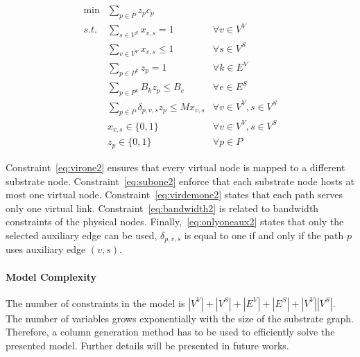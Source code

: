\begin{align}
    \min & \sum\limits_{p \in P}  z_{p} c_{p} \nonumber \\
    s.t. & \sum\limits_{s \in V^{S}} x_{v,s} = 1                                  & \forall v \in V^{V} \label{eq:virone2} \\
         & \sum\limits_{v \in V^{V}} x_{v,s} \leq 1                               & \forall s \in V^{S} \label{eq:subone2}\\
         & \sum\limits_{p \in P^{k}} z_{p} = 1                                    & \forall k \in E^{V} \label{eq:virdemone2}\\
         & \sum\limits_{p \in P^{k}} B_{k} z_{p} \leq B_{e}                                & \forall e \in E^{S} \label{eq:bandwidth2} \\
         & \sum\limits_{p \in P} \delta_{p,v,s} z_{p} \leq M x_{v,s}                 & \forall v \in V^{V}, s \in V^{S} \label{eq:onlyoneaux2} \\
         & x_{v,s} \in \{0,1\} & \forall v \in V^{V}, s \in V^{S} \\
         & z_{p} \in \{0,1\} & \forall p \in {P}
\end{align} 

Constraint~\ref{eq:virone2} ensures that every virtual node is mapped to a different substrate node. Constraint~\ref{eq:subone2} enforce that each substrate node hosts at most one virtual node. Constraint~\ref{eq:virdemone2} states that each path serves only one virtual link. Constraint~\ref{eq:bandwidth2} is related to bandwidth constraints of the physical nodes. Finally,~\ref{eq:onlyoneaux2} states that only the selected auxiliary edge can be used, $\delta_{p,v,s}$ is equal to one if and only if the path $p$ uses auxiliary edge $(v,s)$.

\paragraph{Model Complexity}
The number of constraints in the model is $|V^{V}| + |V^{S}| + |E^{V}| + |E^{S}| + |V^{V}||V^{S}|$. The number of variables grows exponentially with the size of the substrate graph. Therefore, a column generation method has to be used to efficiently solve the presented model. Further details will be presented in future works.


